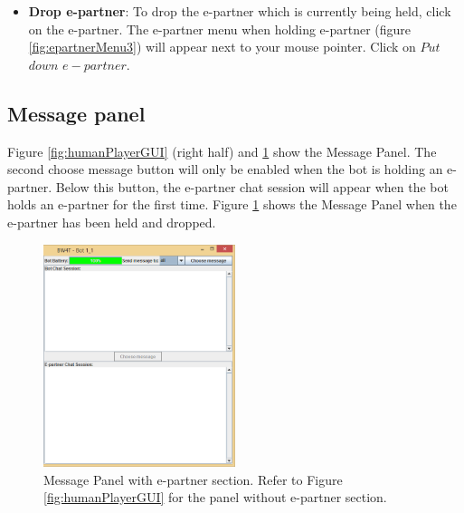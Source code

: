 \begin{itemize}
\item \textbf{Drop e-partner}:
To drop the e-partner which is currently being held, click on the e-partner. The e-partner menu when holding e-partner (figure  \ref{fig:epartnerMenu3}) will appear next to your mouse pointer. Click on $Put$ $down$ $e-partner$.

\end{itemize}


\subsection{Message panel}
Figure \ref{fig:humanPlayerGUI} (right half) and \ref{fig:mp2} show the Message Panel. The second choose message button will only be enabled when the bot is holding an e-partner. Below this button, the e-partner chat session will appear when the bot holds an e-partner for the first time. Figure \ref{fig:mp2} shows the Message Panel when the e-partner has been held and dropped.

\begin{figure}[h]
\begin{center}
\includegraphics[width=0.5\textwidth]{HumanPlayerGUI/hpg-right-epartner.png}
\end{center}
\caption{Message Panel with e-partner section. Refer to Figure \ref{fig:humanPlayerGUI} for the panel without e-partner section. }
\label{fig:mp2}
\end{figure}

